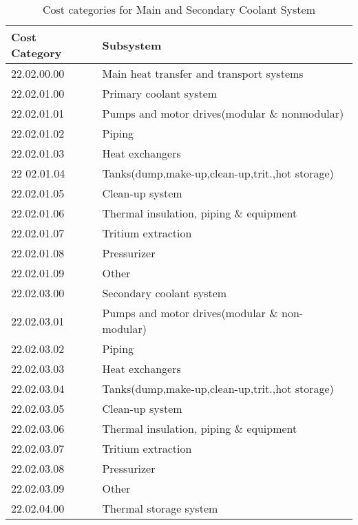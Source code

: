\begin{table}[h!]   
     \centering   
     \begin{tabular}{l l  }   
     \hline
     Cost Category &   Subsystem				\\
      \hline
 22.02.00.00 &   Main heat transfer and transport systems				\\
 22.02.01.00 &     Primary coolant system				\\
 22.02.01.01 &       Pumps and  motor drives(modular \& nonmodular)				\\
 22.02.01.02 &       Piping				\\
 22.02.01.03 &       Heat exchangers				\\
 22 02.01.04 &       Tanks(dump,make-up,clean-up,trit.,hot storage)		\\		
 22.02.01.05 &       Clean-up system				\\
 22.02.01.06 &       Thermal insulation, piping \& equipment				\\
 22.02.01.07 &       Tritium extraction				\\
 22.02.01.08 &       Pressurizer				\\
 22.02.01.09 &       Other				\\
 22.02.03.00 &     Secondary coolant system				\\
 22.02.03.01 &       Pumps and motor drives(modular \& non-modular)			\\	
 22.02.03.02 &       Piping				\\
 22.02.03.03 &       Heat exchangers				\\
 22.02.03.04 &       Tanks(dump,make-up,clean-up,trit.,hot storage)			\\	
 22.02.03.05 &       Clean-up system				\\
 22.02.03.06 &       Thermal insulation, piping \& equipment				\\
 22.02.03.07 &       Tritium extraction				\\
 22.02.03.08 &       Pressurizer				\\
 22.02.03.09 &       Other				\\
 22.02.04.00 &     Thermal storage system  \\
 \hline
     \end{tabular}  
     \caption{Cost categories for Main and Secondary Coolant System }  
     \label{tab:222}  
 \end{table}   


